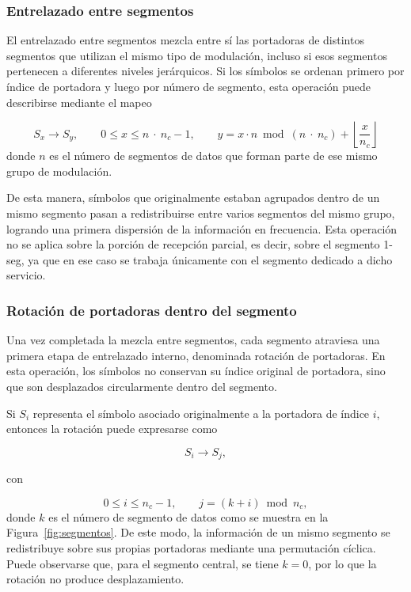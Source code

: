 \subsubsection{Entrelazado entre segmentos}

El entrelazado entre segmentos mezcla entre sí las portadoras de distintos segmentos que utilizan el mismo tipo de modulación, incluso si esos segmentos pertenecen a diferentes niveles jerárquicos. Si los símbolos se ordenan primero por índice de portadora y luego por número de segmento, esta operación puede describirse mediante el mapeo

\begin{equation}
S_x \rightarrow S_y,
\qquad
0 \leq x \leq n\ \cdot \ n_c - 1,
\qquad
y = x \cdot n \bmod (n\ \cdot \ n_c) + \left\lfloor \frac{x}{n_c} \right\rfloor
\end{equation}
donde \(n\) es el número de segmentos de datos que forman parte de ese mismo grupo de modulación.

De esta manera, símbolos que originalmente estaban agrupados dentro de un mismo segmento pasan a redistribuirse entre varios segmentos del mismo grupo, logrando una primera dispersión de la información en frecuencia. Esta operación no se aplica sobre la porción de recepción parcial, es decir, sobre el segmento 1-seg, ya que en ese caso se trabaja únicamente con el segmento dedicado a dicho servicio.

\subsubsection{Rotación de portadoras dentro del segmento}

Una vez completada la mezcla entre segmentos, cada segmento atraviesa una primera etapa de entrelazado interno, denominada rotación de portadoras. En esta operación, los símbolos no conservan su índice original de portadora, sino que son desplazados circularmente dentro del segmento.

Si $S_i$ representa el símbolo asociado originalmente a la portadora de índice $i$, entonces la rotación puede expresarse como

\begin{equation}
S_i \rightarrow S_j,
\end{equation}

con

\begin{equation}
0 \leq i \leq n_c - 1,
\qquad
j = (k + i) \bmod n_c,
\end{equation}
donde $k$ es el número de segmento de datos  como se muestra en la Figura~\ref{fig:segmentos}. De este modo, la información de un mismo segmento se redistribuye sobre sus propias portadoras mediante una permutación cíclica. Puede observarse que, para el segmento central, se tiene $k=0$, por lo que la rotación no produce desplazamiento.

